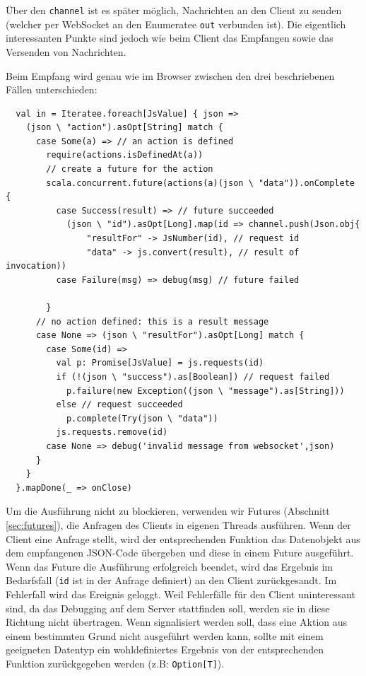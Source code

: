 Über den \texttt{channel} ist es später möglich, Nachrichten an den Client zu senden (welcher per
WebSocket an den Enumeratee \texttt{out} verbunden ist). Die eigentlich interessanten Punkte sind
jedoch wie beim Client das Empfangen sowie das Versenden von Nachrichten.

Beim Empfang wird genau wie im Browser zwischen den drei beschriebenen Fällen unterschieden:

\begin{lstlisting}
  val in = Iteratee.foreach[JsValue] { json =>    
    (json \ "action").asOpt[String] match {
      case Some(a) => // an action is defined    
        require(actions.isDefinedAt(a))
        // create a future for the action
        scala.concurrent.future(actions(a)(json \ "data")).onComplete {
          case Success(result) => // future succeeded
            (json \ "id").asOpt[Long].map(id => channel.push(Json.obj{
                "resultFor" -> JsNumber(id), // request id
                "data" -> js.convert(result), // result of invocation))
          case Failure(msg) => debug(msg) // future failed
           
        }
      // no action defined: this is a result message
      case None => (json \ "resultFor").asOpt[Long] match {
        case Some(id) => 
          val p: Promise[JsValue] = js.requests(id)
          if (!(json \ "success").as[Boolean]) // request failed
            p.failure(new Exception((json \ "message").as[String]))
          else // request succeeded
            p.complete(Try(json \ "data"))
          js.requests.remove(id)
        case None => debug('invalid message from websocket',json)
      }
    }
  }.mapDone(_ => onClose)
\end{lstlisting}

Um die Ausführung nicht zu blockieren, verwenden wir Futures (Abschnitt\,\ref{sec:futures}), die
Anfragen des Clients in eigenen Threads ausführen. Wenn der Client eine Anfrage stellt, wird der
entsprechenden Funktion das Datenobjekt aus dem empfangenen JSON-Code übergeben und diese in einem
Future ausgeführt. Wenn das Future die Ausführung erfolgreich beendet, wird das Ergebnis im
Bedarfsfall (\texttt{id} ist in der Anfrage definiert) an den Client zurückgesandt. Im Fehlerfall
wird das Ereignis geloggt. Weil Fehlerfälle für den Client uninteressant sind, da das Debugging auf
dem Server stattfinden soll, werden sie in diese Richtung nicht übertragen. Wenn signalisiert
werden soll, dass eine Aktion aus einem bestimmten Grund nicht ausgeführt werden kann, sollte mit
einem geeigneten Datentyp ein wohldefiniertes Ergebnis von der entsprechenden Funktion zurückgegeben
werden (z.B: \texttt{Option[T]}).

